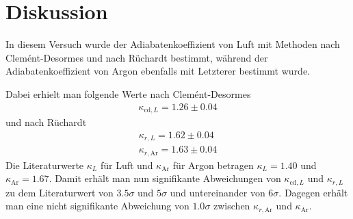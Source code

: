 \documentclass[12pt,a4paper,german]{scrartcl}
\numberwithin{equation}{section}
\begin{document}
  \newpage
  \section{Diskussion}
  In diesem Versuch wurde der Adiabatenkoeffizient von Luft mit Methoden nach Clemént-Desormes und nach Rüchardt bestimmt, während der Adiabatenkoeffizient von Argon ebenfalls mit Letzterer bestimmt wurde.

  Dabei erhielt man folgende Werte nach Clemént-Desormes
  \begin{align}
    \kappa_{\text{cd},L} = 1.26 \pm 0.04
  \end{align}
  und nach Rüchardt
  \begin{align}
    \kappa_{r,L} = 1.62 \pm 0.04 \nonumber \\
    \kappa_{r,\text{Ar}} = 1.63 \pm 0.04
  \end{align}
  Die Literaturwerte $\kappa_L$ für Luft und $\kappa_\text{Ar}$ für Argon betragen $\kappa_L = 1.40$ und $\kappa_\text{Ar} = 1.67$.
  Damit erhält man nun signifikante Abweichungen von $\kappa_{\text{cd},L}$ und $\kappa_{r,L}$ zu dem Literaturwert von $3.5\sigma$ und $5\sigma$ und untereinander von $6\sigma$.
  Dagegen erhält man eine nicht signifikante Abweichung von $1.0\sigma$ zwischen $\kappa_{r,\text{Ar}}$ und $\kappa_{\text{Ar}}$.
\end{document}
